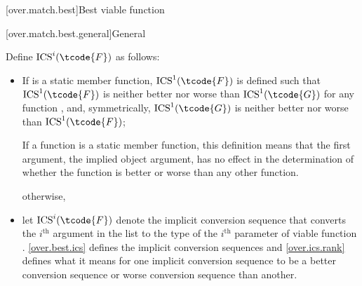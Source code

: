 [over.match.best]{Best viable function}%

[over.match.best.general]{General}%

\pnum
{}%
Define $\text{ICS}^i(\tcode{F})$ as follows:
\begin{itemize}
\item
If  is a static member function,
$\text{ICS}^1(\tcode{F})$ is defined such that
$\text{ICS}^1(\tcode{F})$ is neither better nor worse than
$\text{ICS}^1(\tcode{G})$ for any function ,
and, symmetrically, $\text{ICS}^1(\tcode{G})$ is neither better nor worse than
$\text{ICS}^1(\tcode{F})$;
\begin{footnote}
If a function is a static member function, this
definition means that the first argument, the implied object argument,
has no effect in the determination of whether the function is better
or worse than any other function.
\end{footnote}
otherwise,
\item
let $\text{ICS}^i(\tcode{F})$ denote the implicit conversion sequence that converts
the $i^\text{th}$ argument in the list to the type of
the $i^\text{th}$ parameter of viable function .
\ref{over.best.ics} defines the implicit conversion sequences and \ref{over.ics.rank}
defines what it means for one implicit conversion sequence to be
a better conversion sequence or worse conversion sequence than
another.
\end{itemize}

